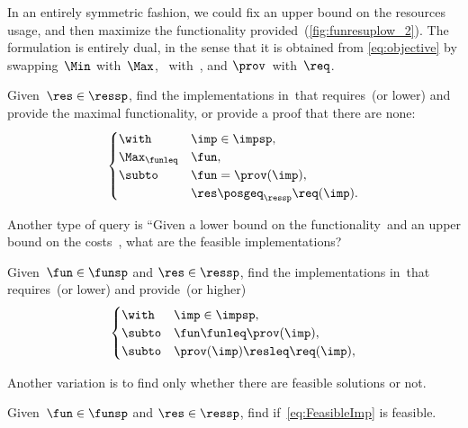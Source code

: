 In an entirely symmetric fashion, we could fix an upper bound on the resources usage, and then maximize the functionality provided~(\cref{fig:funresuplow_2}).
The formulation is entirely dual, in the sense that it is obtained from \cref{eq:objective} by swapping~$\Min$ with~$\Max$, \funsp~with~\ressp,
and $\prov$~with~$\req$.

\begin{problem}[\FixResMaxFun]
\label{prob:FixResMaxFun}
Given~$\res\in\ressp$, find the implementations in~\impsp that requires~\res (or lower) and provide the maximal functionality, or provide a proof that there are none:
\begin{equation}
	\begin{cases}
		\with          & \imp\in\impsp,                  \\
		\Max_{\funleq} & \fun,                           \\
		\subto         & \fun=\prov(\imp),               \\
		               & \res\posgeq_{\ressp}\req(\imp).
	\end{cases}\label{eq:objective-1}
\end{equation}
\end{problem}


\begin{figure*}
	\centering
	\caption{}
	\label{fig:funresuplow_2}
\end{figure*}

Another type of query is
``Given a lower bound on the functionality~\fun and an upper bound on the costs~\fun, what are the feasible implementations?

\begin{problem}[\FeasibleImp]
\label{prob:FeasibleImp}
Given~$\fun\in\funsp$ and $\res\in\ressp$, find the implementations in~\impsp that requires~\res (or lower) and provide~\fun (or higher)
\begin{equation}
	\label{eq:FeasibleImp}
	\begin{cases}
		\with  & \imp\in\impsp,                   \\
		\subto & \fun \funleq \prov(\imp),        \\
		\subto & \prov(\imp) \resleq \req(\imp) , \\
	\end{cases}
\end{equation}
\end{problem}

Another variation is to find only whether there are feasible solutions or not.

\begin{problem}[\Feasibility]
\label{prob:Feasibility}
Given~$\fun\in\funsp$ and $\res\in\ressp$, find if~\cref{eq:FeasibleImp} is feasible.
\end{problem}
